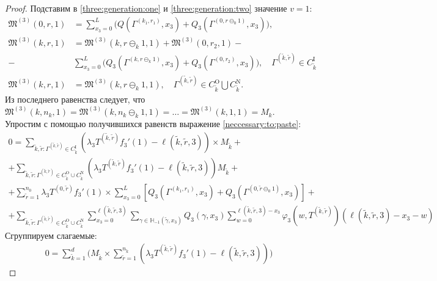 \documentclass[a4paper,12pt,russian]{extarticle}
\begin{document}
\begin{proof}
Подставим в \eqref{three:generation:one} и \eqref{three:generation:two} значение $v=1$:
\begin{align*}
    \mathfrak{M}^{(3)}(0,r,1) &= \sum_{x_3=0}^{L} \biggl(Q(\Gamma^{(k_1,r_1)}, x_3) + Q_3(\Gamma^{(0,r\ominus_{0}1)}, x_3) \biggr),\\
    \mathfrak{M}^{(3)}(k,r,1) &=\mathfrak{M}^{(3)}(k,r\ominus_{k}1,1) +\mathfrak{M}^{(3)}(0,r_2,1)-\\
    - &\sum_{x_3=0}^{L} \biggl(Q_3(\Gamma^{(k,r\ominus_{k}1)}, x_3) + Q_3(\Gamma^{(0,r_2)}, x_3) \biggr),  
    \quad \Gamma^{(\tilde{k}, \tilde{r})} \in C_{\tilde{k}}^{\mathrm{I}}\\
    \mathfrak{M}^{(3)}(k,r,1) &= \mathfrak{M}^{(3)}(k,r\ominus_k 1,1), \quad \Gamma^{(\tilde{k}, \tilde{r})} \in C_{\tilde{k}}^{\mathrm{O}} \bigcup C_{\tilde{k}}^{\mathrm{N}}.
\end{align*}
Из последнего равенства следует, что $ \mathfrak{M}^{(3)}(k,n_k,1) =  \mathfrak{M}^{(3)}(k,n_k\ominus_k 1,1) = \ldots =  \mathfrak{M}^{(3)}(k,1,1) = M_k$.
Упростим с помощью получившихся равенств выражение \eqref{neccessary:to:paste}:
\begin{multline}
 0 = \sum_{\tilde{k},\tilde{r}\colon \Gamma^{(\tilde{k}, \tilde{r})} \in C_{\tilde{k}}^{\mathrm{I}}} (\lambda_3 T^{(\tilde{k},\tilde{r})} f_3'(1) - \ell(\tilde{k},\tilde{r},3))
     \times   M_{\tilde{k}}
 +\\+ \sum_{\tilde{k},\tilde{r}\colon \Gamma^{(\tilde{k}, \tilde{r})} \in C_{\tilde{k}}^{\mathrm{O}}\cup C_{\tilde{k}}^{\mathrm{N}}} (\lambda_3 T^{(\tilde{k},\tilde{r})} f_3'(1) - \ell(\tilde{k},\tilde{r},3)) M_{\tilde{k}}   +\\+ \sum_{\tilde{r}=1}^{n_0} \lambda_3 T^{(0,\tilde{r})} f_3'(1)  \times \sum_{x_3=0}^{L} \left[ Q_3(\Gamma^{(k_1,r_1)},x_3) + Q_3(\Gamma^{(0,\tilde{r}\ominus_0 1)},x_3) \right]   +\\+  \sum_{\tilde{k},\tilde{r}\colon \Gamma^{(\tilde{k}, \tilde{r})} \in C_{\tilde{k}}^{\mathrm{O}}\cup C_{\tilde{k}}^{\mathrm{N}}} \sum_{x_3=0}^{\ell(\tilde{k},\tilde{r},3)}\sum_{\gamma \in {\mathbb H}_{-1}(\tilde{\gamma},x_3)} Q_3(\gamma,x_3) \sum_{w=0}^{\ell(\tilde{k},\tilde{r},3) - x_3} \varphi_3(w,T^{(\tilde{k},\tilde{r})}) (\ell(\tilde{k},\tilde{r},3)-x_3 - w)
 \label{neccessary:to:paste:one}
\end{multline}
Сгруппируем слагаемые:
\begin{multline}
 0 = \sum_{\tilde{k} = 1}^d \biggl( M_{\tilde{k}} \times \sum_{\tilde{r} = 1}^{n_{\tilde{k}}} (\lambda_3 T^{(\tilde{k},\tilde{r})} f_3'(1) - \ell(\tilde{k},\tilde{r},3))\biggr)

\end{multline}
\end{proof}
\end{document}

